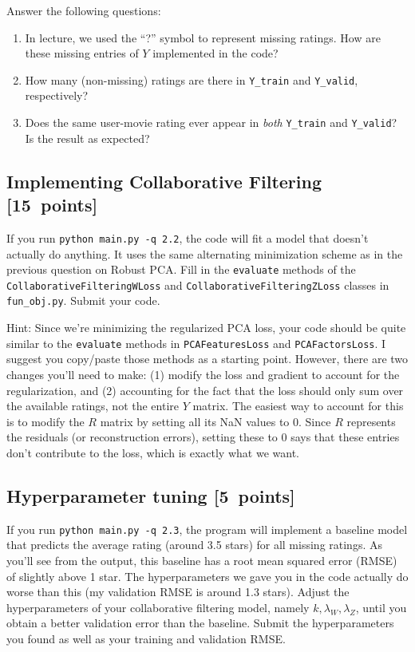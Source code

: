 \documentclass{article}
\newcommand{\blu}[1]{{\textcolor{blu}{#1}}}
\let\ask\blu
\newcommand\pts[1]{\textcolor{pointscolour}{[#1~points]}}
\begin{document}
\ask{Answer the following questions:}

\begin{enumerate}
\item In lecture, we used the ``?'' symbol to represent missing ratings. How are these missing entries of $Y$ implemented in the code?
\item How many (non-missing) ratings are there in \texttt{Y\_train} and \texttt{Y\_valid}, respectively?
\item Does the same user-movie rating ever appear in \emph{both} \texttt{Y\_train} and \texttt{Y\_valid}? Is the result as expected?
\end{enumerate}


\subsection{Implementing Collaborative Filtering \pts{15}}

If you run \texttt{python main.py -q 2.2}, the code will fit a model that doesn't actually do anything. It uses the same alternating minimization scheme as in the previous question on Robust PCA. \ask{Fill in the \texttt{evaluate} methods of the \texttt{CollaborativeFilteringWLoss} and \texttt{CollaborativeFilteringZLoss} classes in \texttt{fun\_obj.py}. Submit your code.}

Hint: Since we're minimizing the regularized PCA loss, your code should be quite similar to the \texttt{evaluate} methods in \texttt{PCAFeaturesLoss} and \texttt{PCAFactorsLoss}. I suggest you copy/paste those methods as a starting point. However, there are two changes you'll need to make: (1) modify the loss and gradient to account for the regularization, and (2) accounting for the fact that the loss should only sum over the available ratings, not the entire $Y$ matrix. The easiest way to account for this is to modify the $R$ matrix by setting all its NaN values to 0. Since $R$ represents the residuals (or reconstruction errors), setting these to 0 says that these entries don't contribute to the loss, which is exactly what we want.



\subsection{Hyperparameter tuning \pts{5}}
If you run \texttt{python main.py -q 2.3}, the program will implement a baseline model that predicts the average rating (around 3.5 stars) for all missing ratings.
As you'll see from the output, this baseline has a root mean squared error (RMSE) of slightly above 1 star. The hyperparameters we gave you in the code actually do worse than this (my validation RMSE is around 1.3 stars). \ask{Adjust the hyperparameters of your collaborative filtering model, namely $k,\lambda_W,\lambda_Z$, until you obtain a better validation error than the baseline. Submit the hyperparameters you found as well as your training and validation RMSE.}
\end{document}
